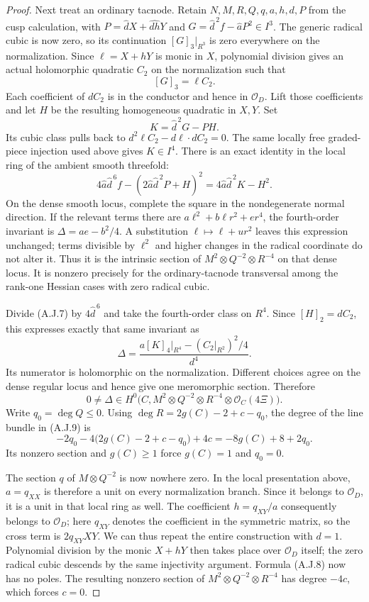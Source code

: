 \begin{proof}
Next treat an ordinary tacnode. Retain $N,M,R,Q,q,a,h,d,P$
from the cusp calculation, with
$P=\widehat d X+\widehat{dh}Y$ and
$G=\widehat d^{\,2}f-\widehat aP^2\in I^3$.
The generic radical cubic is now zero, so its continuation
$[G]_3|_{R^3}$ is zero everywhere on the normalization.
Since $\ell=X+hY$ is monic in $X$, polynomial division gives
an actual holomorphic quadratic $C_2$ on the normalization
such that
\[
 [G]_3=\ell C_2.
\]
Each coefficient of $dC_2$ is in the conductor and hence in
$\mathcal O_D$. Lift those coefficients and let $H$ be the
resulting homogeneous quadratic in $X,Y$. Set
\[
 K=\widehat d^{\,2}G-PH.
\]
Its cubic class pulls back to
$d^2\ell C_2-d\ell\cdot dC_2=0$.
The same locally free graded-piece injection used above gives
$K\in I^4$. There is an exact identity in the local ring of
the ambient smooth threefold:
\[
 4\widehat a\widehat d^{\,6}f
 -(2\widehat a\widehat d^{\,2}P+H)^2
 =4\widehat a\widehat d^{\,2}K-H^2.               \tag{A.J.7}
\]
On the dense smooth locus, complete the square in the
nondegenerate normal direction. If the relevant terms there
are $a\ell^2+b\ell r^2+er^4$, the fourth-order invariant is
$\Delta=ae-b^2/4$. A substitution
$\ell\mapsto\ell+ur^2$ leaves this expression unchanged;
terms divisible by $\ell^2$ and higher changes in the radical
coordinate do not alter it. Thus it is the intrinsic section
of $M^2\otimes Q^{-2}\otimes R^{-4}$ on that dense locus.
It is nonzero precisely for the ordinary-tacnode transversal
among the rank-one Hessian cases with zero radical cubic.

Divide (A.J.7) by $4\widehat d^{\,6}$ and take the
fourth-order class on $R^4$. Since
$[H]_2=dC_2$, this expresses exactly that same invariant as
\[
 \Delta=
 \frac{a[K]_4|_{R^4}-(C_2|_{R^2})^2/4}{d^4}.
                                                        \tag{A.J.8}
\]
Its numerator is holomorphic on the normalization.
Different choices agree on the dense regular locus and hence
give one meromorphic section. Therefore
\[
 0\ne\Delta\in H^0\bigl(C,M^2\otimes Q^{-2}
                    \otimes R^{-4}\otimes\mathcal O_C(4\Xi)\bigr).
                                                        \tag{A.J.9}
\]
Write $q_0=\deg Q\leq0$. Using
$\deg R=2g(C)-2+c-q_0$, the degree of the line bundle
in (A.J.9) is
\[
 -2q_0-4\bigl(2g(C)-2+c-q_0\bigr)+4c
       =-8g(C)+8+2q_0.
\]
Its nonzero section and $g(C)\geq1$ force
$g(C)=1$ and $q_0=0$.

The section $q$ of $M\otimes Q^{-2}$ is now nowhere zero.
In the local presentation above, $a=q_{XX}$ is therefore a
unit on every normalization branch. Since it belongs to
$\mathcal O_D$, it is a unit in that local ring as well.
The coefficient $h=q_{XY}/a$ consequently belongs to
$\mathcal O_D$; here $q_{XY}$ denotes the coefficient in
the symmetric matrix, so the cross term is $2q_{XY}XY$.
We can thus repeat the entire construction with $d=1$.
Polynomial division by the monic $X+hY$ then takes place
over $\mathcal O_D$ itself; the zero radical cubic descends
by the same injectivity argument. Formula (A.J.8) now has
no poles. The resulting nonzero section of
$M^2\otimes Q^{-2}\otimes R^{-4}$ has degree $-4c$,
which forces $c=0$.


\end{proof}
